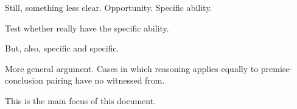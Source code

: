 \begin{note}
  Still, something less clear.
  Opportunity.
  Specific ability.

  Test whether really have the specific ability.

  But, also, specific and specific.
\end{note}

\begin{note}
  More general argument.
  Cases in which reasoning applies equally to premise-conclusion pairing have no witnessed from.

  This is the main focus of this document.
\end{note}


